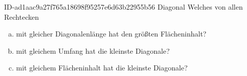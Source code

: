 \begin{exercise}
      {ID-ad1aac9a27f765a18698f95257e6d63b22955b56}
      {Diagonal}
  \ifproblem\problem
    Welches von allen Rechtecken
    \begin{enumerate}[a)]
      \item mit gleicher Diagonalenlänge hat den größten Flächeninhalt?
      \item mit gleichem Umfang hat die kleinste Diagonale?
      \item mit gleichem Flächeninhalt hat die kleinste Diagonale?
    \end{enumerate}
  \fi
\end{exercise}

